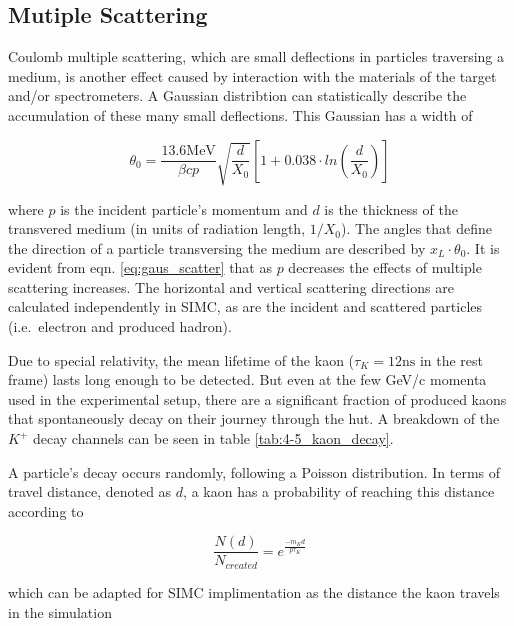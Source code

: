 \documentclass[
]{report}
\begin{document}
\hypertarget{mutiple-scattering}{%
\subsection{Mutiple Scattering}\label{mutiple-scattering}}

Coulomb multiple scattering, which are small deflections in particles
traversing a medium, is another effect caused by interaction with the
materials of the target and/or spectrometers. A Gaussian distribtion can
statistically describe the accumulation of these many small deflections.
This Gaussian has a width of

\begin{equation} 
  \theta_0=\frac{13.6 \text{MeV}}{\beta cp}\sqrt{\frac{d}{X_0}}[1+0.038\cdot ln(\frac{d}{X_0})]
  \label{eq:gaus_scatter} 
\end{equation}

\noindent where \(p\) is the incident particle's momentum and \(d\) is
the thickness of the transvered medium (in units of radiation length,
\(1/X_0\)). The angles that define the direction of a particle
transversing the medium are described by \(x_L\cdot\theta_0\). It is
evident from eqn. \ref{eq:gaus_scatter} that as \(p\) decreases the
effects of multiple scattering increases. The horizontal and vertical
scattering directions are calculated independently in SIMC, as are the
incident and scattered particles (i.e.~electron and produced hadron).

\label{Chapter-4-4}



Due to special relativity, the mean lifetime of the kaon
(\(\tau_K=12\text{ns}\) in the rest frame) lasts long enough to be
detected. But even at the few GeV/c momenta used in the experimental
setup, there are a significant fraction of produced kaons that
spontaneously decay on their journey through the hut. A breakdown of the
\(K^+\) decay channels can be seen in table \ref{tab:4-5_kaon_decay}.

A particle's decay occurs randomly, following a Poisson distribution. In
terms of travel distance, denoted as \(d\), a kaon has a probability of
reaching this distance according to

\begin{equation} 
  \frac{N(d)}{N_{created}}=e^{\frac{-m_Kd}{p\tau_K}}
  \label{eq:kaon_decay} 
\end{equation}

\noindent which can be adapted for SIMC implimentation as the distance
the kaon travels in the simulation
\end{document}
